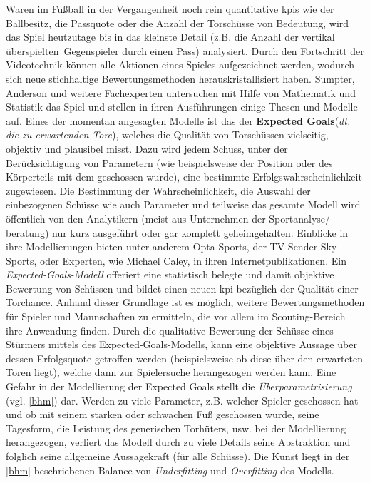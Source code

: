 Waren im Fußball in der Vergangenheit noch rein quantitative \glspl{kpi} wie der Ballbesitz, die Passquote oder die Anzahl der Torschüsse von Bedeutung, wird das Spiel heutzutage bis in das kleinste Detail (z.B. die Anzahl der vertikal \glqq überspielten\grqq~Gegenspieler durch einen Pass) analysiert. Durch den Fortschritt der Videotechnik können alle Aktionen eines Spieles aufgezeichnet werden, wodurch sich neue stichhaltige Bewertungsmethoden herauskristallisiert haben. Sumpter, Anderson und weitere Fachexperten untersuchen mit Hilfe von Mathematik und Statistik das Spiel und stellen in ihren Ausführungen einige Thesen und Modelle auf. Eines der momentan angesagten Modelle ist das der \glqq \textbf{Expected Goals}\grqq (\textit{dt. die zu erwartenden Tore}), welches die Qualität von Torschüssen vielseitig, objektiv und plausibel misst. Dazu wird jedem Schuss, unter der Berücksichtigung von Parametern (wie beispielsweise der Position oder des Körperteils mit dem geschossen wurde), eine bestimmte Erfolgswahrscheinlichkeit zugewiesen. Die Bestimmung der Wahrscheinlichkeit, die Auswahl der einbezogenen Schüsse wie auch Parameter und teilweise das gesamte Modell wird öffentlich von den Analytikern (meist aus Unternehmen der Sportanalyse/-beratung) nur kurz ausgeführt oder gar komplett geheimgehalten. Einblicke in ihre Modellierungen bieten unter anderem Opta Sports, der TV-Sender Sky Sports, oder Experten, wie Michael Caley, in ihren Internetpublikationen. Ein \textit{Expected-Goals-Modell} offeriert eine statistisch belegte und damit objektive Bewertung von Schüssen und bildet einen neuen \gls{kpi} bezüglich der Qualität einer Torchance. Anhand dieser Grundlage ist es möglich, weitere Bewertungsmethoden für Spieler und Mannschaften zu ermitteln, die vor allem im Scouting-Bereich ihre Anwendung finden. Durch die qualitative Bewertung der Schüsse eines Stürmers mittels des Expected-Goals-Modells, kann eine objektive Aussage über dessen Erfolgsquote getroffen werden (beispielsweise ob diese über den erwarteten Toren liegt), welche dann zur Spielersuche herangezogen werden kann. Eine Gefahr in der Modellierung der Expected Goals stellt die \textit{Überparametrisierung} (vgl. \vref{bhm}) dar. Werden zu viele Parameter, z.B. welcher Spieler geschossen hat und ob mit seinem starken oder schwachen Fuß geschossen wurde, seine Tagesform, die Leistung des generischen Torhüters, usw. bei der Modellierung herangezogen, verliert das Modell durch zu viele Details seine Abstraktion und folglich seine allgemeine Aussagekraft (für alle Schüsse). Die Kunst liegt in der \vref{bhm} beschriebenen Balance von \textit{Underfitting} und \textit{Overfitting} des Modells.

